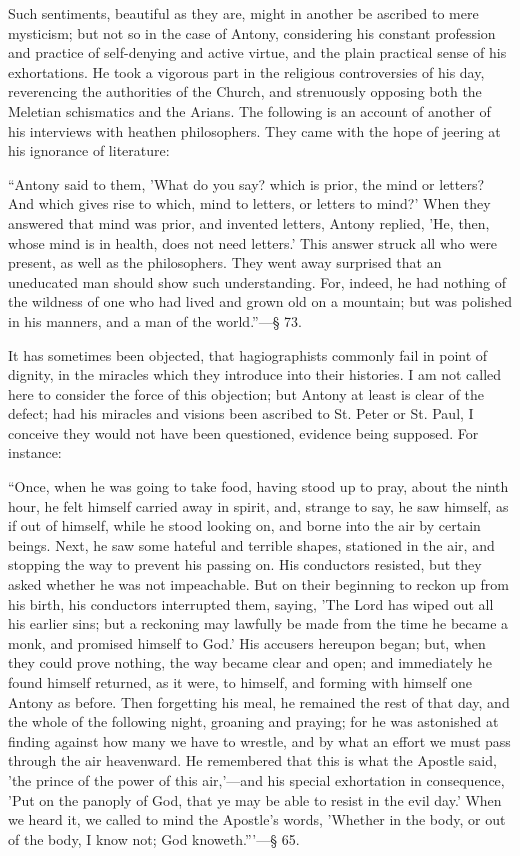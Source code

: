 Such sentiments, beautiful as they are, might in another be
ascribed to mere mysticism; but not so in the case of Antony,
considering his constant profession and practice of self-denying
and active virtue, and the plain practical sense of his exhortations.
He took a vigorous part in the religious controversies of his day,
reverencing the authorities of the Church, and strenuously opposing
both the Meletian schismatics and the Arians. The following is an
account of another of his interviews with heathen philosophers. They
came with the hope of jeering at his ignorance of literature:

``Antony said to them, 'What do you say? which is prior, the
mind or letters? And which gives rise to which, mind to letters, or
letters to mind?' When they answered that mind was prior, and invented
letters, Antony replied, 'He, then, whose mind is in health, does not
need letters.' This answer struck all who were present, as well as the
philosophers. They went away surprised that an uneducated man should
show such understanding. For, indeed, he had nothing of the wildness
of one who had lived and grown old on a mountain; but was polished in
his manners, and a man of the world.''—§ 73.

It has sometimes been objected, that hagiographists commonly fail
in point of dignity, in the miracles which they introduce into their
histories. I am not called here to consider the force of this
objection; but Antony at least is clear of the defect; had his
miracles and visions been ascribed to St. Peter or St. Paul, I
conceive they would not have been questioned, evidence being supposed.
For instance:

``Once, when he was going to take food, having stood up to
pray, about the ninth hour, he felt himself carried away in spirit,
and, strange to say, he saw himself, as if out of himself, while he
stood looking on, and borne into the air by certain beings. Next, he
saw some hateful and terrible shapes, stationed in the air, and
stopping the way to prevent his passing on. His conductors resisted,
but they asked whether he was not impeachable. But on their beginning
to reckon up from his birth, his conductors interrupted them, saying,
'The Lord has wiped out all his earlier sins; but a reckoning may
lawfully be made from the time he became a monk,
and promised himself to God.' His accusers hereupon began; but, when
they could prove nothing, the way became clear and open; and
immediately he found himself returned, as it were, to himself, and
forming with himself one Antony as before. Then forgetting his meal,
he remained the rest of that day, and the whole of the following
night, groaning and praying; for he was astonished at finding against
how many we have to wrestle, and by what an effort we must pass
through the air heavenward. He remembered that this is what the
Apostle said, 'the prince of the power of this air,'—and his special
exhortation in consequence, 'Put on the panoply of God, that ye may be
able to resist in the evil day.' When we heard it, we called to mind
the Apostle's words, 'Whether in the body, or out of the body, I know
not; God knoweth.'''—§ 65.

